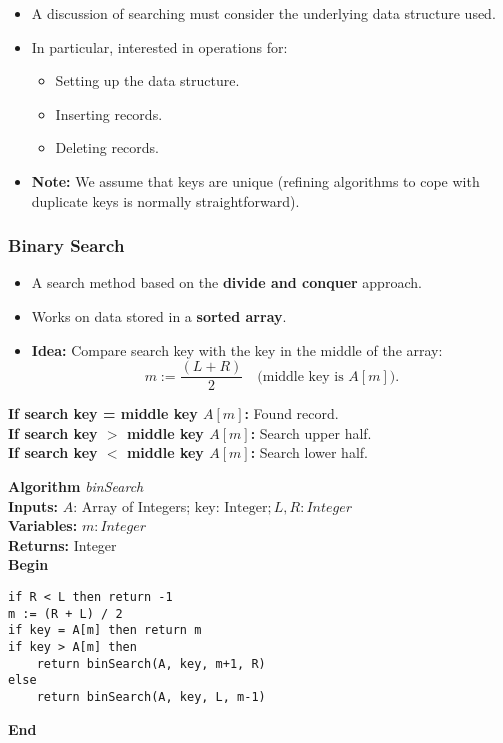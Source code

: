 \documentclass[a4paper,12pt]{article}
\begin{document}
\begin{itemize}
    \item A discussion of searching must consider the underlying data structure used.
    \item In particular, interested in operations for:
    \begin{itemize}
        \item Setting up the data structure.
        \item Inserting records.
        \item Deleting records.
    \end{itemize}
    \item \textbf{Note:} We assume that keys are unique (refining algorithms to cope with duplicate keys is normally straightforward).
\end{itemize}

\subsubsection{Binary Search}

\begin{itemize}
    \item A search method based on the \textbf{divide and conquer} approach.
    \item Works on data stored in a \textbf{sorted array}.
    \item \textbf{Idea:} Compare search key with the key in the middle of the array:
    \[
    m := \frac{(L + R)}{2} \quad \text{(middle key is \(A[m]\))}.
    \]
\end{itemize}

\begin{tcolorbox}[colframe=black, colback=white]
\textbf{If search key = middle key \(A[m]\):} Found record. \\
\textbf{If search key \(>\) middle key \(A[m]\):} Search upper half. \\
\textbf{If search key \(<\) middle key \(A[m]\):} Search lower half.
\end{tcolorbox}

\textbf{Algorithm} \textit{binSearch} \\
\textbf{Inputs:} \(A\): Array of Integers; \(\text{key: Integer}; L, R: Integer\) \\
\textbf{Variables:} \(m: Integer\) \\
\textbf{Returns:} Integer \\

\textbf{Begin}
\begin{verbatim}
if R < L then return -1
m := (R + L) / 2
if key = A[m] then return m
if key > A[m] then
    return binSearch(A, key, m+1, R)
else
    return binSearch(A, key, L, m-1)
\end{verbatim}
\textbf{End}
\end{document}
